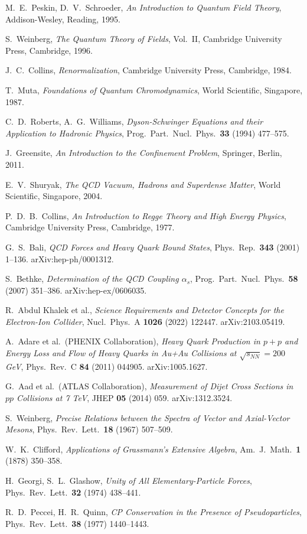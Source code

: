 \documentclass[11pt,a4paper]{article}
\theoremstyle{definition}
\theoremstyle{plain}
\theoremstyle{remark}
\begin{document}
\begin{thebibliography}{99}
M.~E.~Peskin, D.~V.~Schroeder, \emph{An Introduction to Quantum Field Theory}, Addison-Wesley, Reading, 1995.

S.~Weinberg, \emph{The Quantum Theory of Fields}, Vol.~II, Cambridge University Press, Cambridge, 1996.

J.~C.~Collins, \emph{Renormalization}, Cambridge University Press, Cambridge, 1984.

T.~Muta, \emph{Foundations of Quantum Chromodynamics}, World Scientific, Singapore, 1987.

C.~D.~Roberts, A.~G.~Williams, \emph{Dyson-Schwinger Equations and their Application to Hadronic Physics}, Prog.\ Part.\ Nucl.\ Phys.\ \textbf{33} (1994) 477--575.

J.~Greensite, \emph{An Introduction to the Confinement Problem}, Springer, Berlin, 2011.

E.~V.~Shuryak, \emph{The QCD Vacuum, Hadrons and Superdense Matter}, World Scientific, Singapore, 2004.

P.~D.~B.~Collins, \emph{An Introduction to Regge Theory and High Energy Physics}, Cambridge University Press, Cambridge, 1977.

G.~S.~Bali, \emph{QCD Forces and Heavy Quark Bound States}, Phys.\ Rep.\ \textbf{343} (2001) 1--136. arXiv:hep-ph/0001312.

S.~Bethke, \emph{Determination of the QCD Coupling $\alpha_s$}, Prog.\ Part.\ Nucl.\ Phys.\ \textbf{58} (2007) 351--386. arXiv:hep-ex/0606035.

R.~Abdul Khalek et al., \emph{Science Requirements and Detector Concepts for the Electron-Ion Collider}, Nucl.\ Phys.\ A \textbf{1026} (2022) 122447. arXiv:2103.05419.

A.~Adare et al.\ (PHENIX Collaboration), \emph{Heavy Quark Production in $p+p$ and Energy Loss and Flow of Heavy Quarks in Au+Au Collisions at $\sqrt{s_{NN}}=200$ GeV}, Phys.\ Rev.\ C \textbf{84} (2011) 044905. arXiv:1005.1627.

G.~Aad et al.\ (ATLAS Collaboration), \emph{Measurement of Dijet Cross Sections in $pp$ Collisions at 7 TeV}, JHEP \textbf{05} (2014) 059. arXiv:1312.3524.

S.~Weinberg, \emph{Precise Relations between the Spectra of Vector and Axial-Vector Mesons}, Phys.\ Rev.\ Lett.\ \textbf{18} (1967) 507--509.

W.~K.~Clifford, \emph{Applications of Grassmann's Extensive Algebra}, Am.\ J.\ Math.\ \textbf{1} (1878) 350--358.

H.~Georgi, S.~L.~Glashow, \emph{Unity of All Elementary-Particle Forces}, Phys.\ Rev.\ Lett.\ \textbf{32} (1974) 438--441.

R.~D.~Peccei, H.~R.~Quinn, \emph{CP Conservation in the Presence of Pseudoparticles}, Phys.\ Rev.\ Lett.\ \textbf{38} (1977) 1440--1443.

\end{thebibliography}

\end{document}
